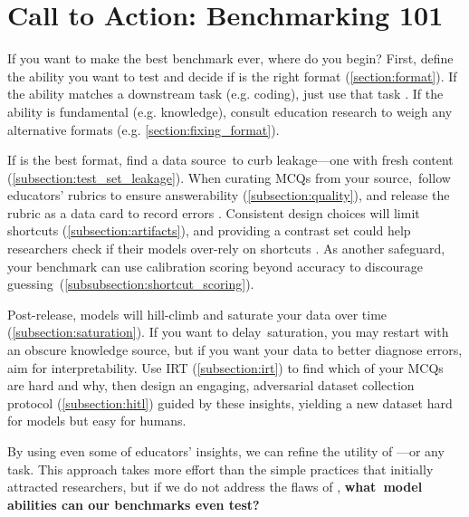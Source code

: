 \section{Call to Action: Benchmarking 101} \label{section:conclusion}


If you want to make the best benchmark ever, where do you begin?
First, define the ability you want to test and decide if \mcqa is the right format (\cref{section:format}).
If the ability matches a downstream task (e.g. coding), just use that task \cite{saxon2024benchmarks}.
If the ability is fundamental (e.g. knowledge), consult education research to weigh any alternative formats (e.g. \cref{section:fixing_format}).

If \mcqa is the best format, find a data source~to curb leakage---one with fresh content (\cref{subsection:test_set_leakage}).
When curating MCQs from your source,~follow educators' rubrics to ensure answerability (\cref{subsection:quality}), and release the rubric as a data card to record errors \cite{pushkarna2022data}.
Consistent design choices will limit shortcuts (\cref{subsection:artifacts}), and providing a contrast set could help researchers check if their models over-rely on shortcuts \cite{Gardner2020EvaluatingML}.
As another safeguard, your benchmark can use calibration scoring beyond accuracy to discourage guessing~(\cref{subsubsection:shortcut_scoring}).

Post-release, models will hill-climb and saturate your data over time (\cref{subsection:saturation}).
If you want to delay~saturation, you may restart with an obscure knowledge source, but if you want your data to better diagnose errors, aim for interpretability.
Use IRT (\cref{subsection:irt}) to find which of your MCQs are hard and why, then design an engaging, adversarial dataset collection protocol (\cref{subsection:hitl}) guided by these insights, yielding a new dataset hard for models but easy for humans.

By using even some of educators' insights, we can refine the utility of \mcqa---or any task.
This approach takes more effort than the simple \mcqa practices that initially attracted researchers, but if we do not address the flaws of \mcqa, \textbf{what~model abilities can our \mcqa benchmarks even test?}
